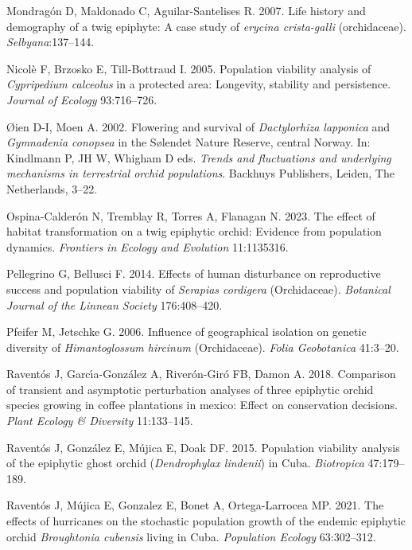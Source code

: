 \documentclass[
  12pt,
  letterpaper,
]{book}
\newlength{\cslhangindent}
\newenvironment{CSLReferences}[2] %
 {\begin{list}{}{%
  \setlength{\itemindent}{0pt}
  \setlength{\leftmargin}{0pt}
  \setlength{\parsep}{0pt}
  \ifodd #1
   \setlength{\leftmargin}{\cslhangindent}
   \setlength{\itemindent}{-1\cslhangindent}
  \fi
  \setlength{\itemsep}{#2\baselineskip}}}
 {\end{list}}
\begin{document}
\begin{CSLReferences}{1}{0}
Mondragón D, Maldonado C, Aguilar-Santelises R. 2007. Life history and
demography of a twig epiphyte: A case study of \emph{erycina
{c}rista-galli} (orchidaceae). \emph{Selbyana}:137--144.

Nicolè F, Brzosko E, Till-Bottraud I. 2005. Population viability
analysis of \emph{{C}ypripedium {c}alceolus} in a protected area:
Longevity, stability and persistence. \emph{Journal of Ecology}
93:716--726.

Øien D-I, Moen A. 2002. Flowering and survival of \emph{{D}actylorhiza
{l}apponica} and \emph{{G}ymnadenia {c}onopsea} in the {S}{ø}lendet
{N}ature {R}eserve, central {N}orway. In: Kindlmann P, JH W, Whigham D
eds. \emph{Trends and fluctuations and underlying mechanisms in
terrestrial orchid populations}. Backhuys Publishers, Leiden, The
Netherlands, 3--22.

Ospina-Calderón N, Tremblay R, Torres A, Flanagan N. 2023. The effect of
habitat transformation on a twig epiphytic orchid: Evidence from
population dynamics. \emph{Frontiers in Ecology and Evolution}
11:1135316.

Pellegrino G, Bellusci F. 2014. Effects of human disturbance on
reproductive success and population viability of \emph{{S}erapias
{c}ordigera} ({O}rchidaceae). \emph{Botanical Journal of the Linnean
Society} 176:408--420.

Pfeifer M, Jetschke G. 2006. Influence of geographical isolation on
genetic diversity of \emph{{H}imantoglossum {h}ircinum} ({O}rchidaceae).
\emph{Folia Geobotanica} 41:3--20.

Raventós J, Garcı́a-González A, Riverón-Giró FB, Damon A. 2018.
Comparison of transient and asymptotic perturbation analyses of three
epiphytic orchid species growing in coffee plantations in mexico: Effect
on conservation decisions. \emph{Plant Ecology \& Diversity}
11:133--145.

Raventós J, González E, Mújica E, Doak DF. 2015. Population viability
analysis of the epiphytic ghost orchid (\emph{{D}endrophylax
{l}indenii}) in {C}uba. \emph{Biotropica} 47:179--189.

Raventós J, Mújica E, Gonzalez E, Bonet A, Ortega-Larrocea MP. 2021. The
effects of hurricanes on the stochastic population growth of the endemic
epiphytic orchid \emph{{B}roughtonia {c}ubensis} living in {C}uba.
\emph{Population Ecology} 63:302--312.


\end{CSLReferences}
\end{document}
